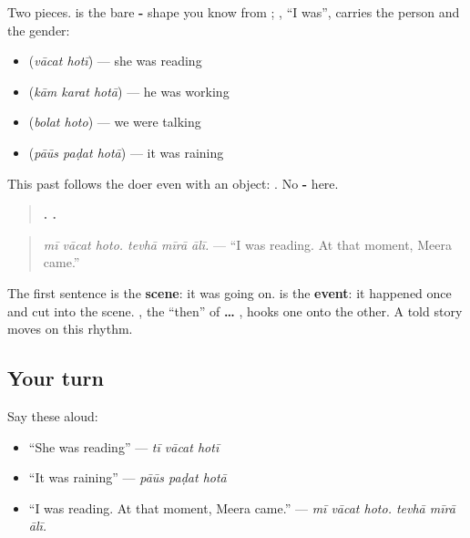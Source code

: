 Two pieces. \textbf{} is the bare \textbf{-} shape you know from \textbf{ }; \textbf{}, \textquotedblleft{}I was\textquotedblright{}, carries the person and the gender:

\begin{itemize}
\raggedright
  \item \textbf{} \textbf{ } (\emph{vācat hotī}) — she was reading
  \item \textbf{} \textbf{  } (\emph{kām karat hotā}) — he was working
  \item \textbf{} \textbf{ } (\emph{bolat hoto}) — we were talking
  \item \textbf{  } (\emph{pāūs paḍat hotā}) — it was raining
\end{itemize}

This past follows the doer even with an object: \textbf{   }. No \textbf{-} here.

\begin{grammarlens}[title={Grammar Lens: the scene and the event}]
\begin{quote}
\textbf{  .   .}
\end{quote}

\begin{quote}
\emph{mī vācat hoto. tevhā mīrā ālī.} — \textquotedblleft{}I was reading. At that moment, Meera came.\textquotedblright{}
\end{quote}

The first sentence is the \textbf{scene}: it was going on. \textbf{} is the \textbf{event}: it happened once and cut into the scene. \textbf{}, the \textquotedblleft{}then\textquotedblright{} of \textbf{ … }, hooks one onto the other. A told story moves on this rhythm.
\end{grammarlens}

\subsection*{Your turn}
Say these aloud:

\begin{itemize}
\raggedright
  \item \textquotedblleft{}She was reading\textquotedblright{} — \emph{tī vācat hotī}
  \item \textquotedblleft{}It was raining\textquotedblright{} — \emph{pāūs paḍat hotā}
  \item \textquotedblleft{}I was reading. At that moment, Meera came.\textquotedblright{} — \emph{mī vācat hoto. tevhā mīrā ālī.}
\end{itemize}

